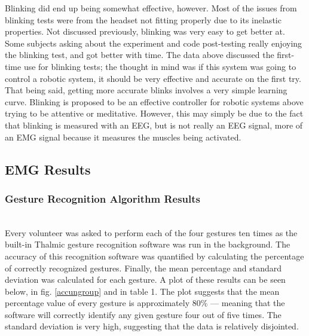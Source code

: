 \documentclass[journal]{IEEEtran}
\begin{document}
Blinking did end up being somewhat effective, however. Most of the issues from blinking tests were from the headset not fitting properly due to its inelastic properties. Not discussed previously, blinking was very easy to get better at. Some subjects asking about the experiment and code post-testing really enjoying the blinking test, and got better with time. The data above discussed the first-time use for blinking tests; the thought in mind was if this system was going to control a robotic system, it should be very effective and accurate on the first try. That being said, getting more accurate blinks involves a very simple learning curve. Blinking is proposed to be an effective controller for robotic systems above trying to be attentive or meditative. However, this may simply be due to the fact that blinking is measured with an EEG, but is not really an EEG signal, more of an EMG signal because it measures the muscles being activated. \par

\newpage
\subsection{EMG Results}
\subsubsection{Gesture Recognition Algorithm Results} \\
Every volunteer was asked to perform each of the four gestures ten times as the built-in Thalmic gesture recognition software was run in the background. The accuracy of this recognition software was quantified by calculating the percentage of correctly recognized gestures. Finally, the mean percentage and standard deviation was calculated for each gesture. A plot of these results can be seen below, in fig. \ref{accungroup} and in table 1. The plot suggests that the mean percentage value of every gesture is approximately $80\%$ --- meaning that the software will correctly identify any given gesture four out of five times. The standard deviation is very high, suggesting that the data is relatively disjointed.

\begin{table}[h]
\end{table}
    
\end{document}
